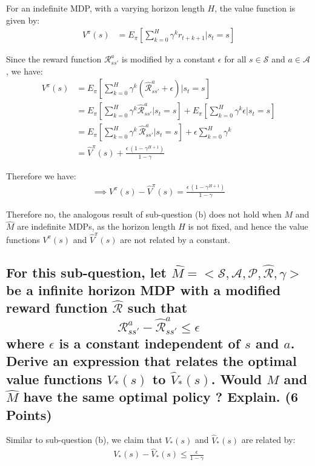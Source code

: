 \documentclass{article}
\renewcommand{\S}{\mathcal{S}}
\newcommand{\A}{\mathcal{A}}
\renewcommand{\P}{\mathcal{P}}
\newcommand{\R}{\mathcal{R}}
\newcommand{\Rhat}{\hat{\mathcal{R}}}
\begin{document}
For an indefinite MDP, with a varying horizon length $H$, the value function is given by:
\begin{align}
	V^\pi(s) &= E_\pi \left[ \sum_{k=0}^{H} \gamma^k r_{t+k+1} \bigg| s_t = s \right]
\end{align}

\noindent
Since the reward function $\R^a_{ss'}$ is modified by a constant $\epsilon$ for all $s \in \S$ and $a \in \A$, we have:
\begin{align}
	V^\pi(s) &= E_\pi \left[ \sum_{k=0}^{H} \gamma^k \left( \Rhat^a_{ss'} + \epsilon \right) \bigg| s_t = s \right] \\
	&= E_\pi \left[ \sum_{k=0}^{H} \gamma^k \Rhat^a_{ss'} \bigg| s_t = s \right] + E_\pi \left[ \sum_{k=0}^{H} \gamma^k \epsilon \bigg| s_t = s \right] \\
	&= E_\pi \left[ \sum_{k=0}^{H} \gamma^k \, \Rhat^a_{ss'} \bigg| s_t = s \right] + \epsilon \sum_{k=0}^{H} \gamma^k \\
	&= \hat{V}^\pi(s) + \frac{\epsilon \, (1 - \gamma^{H+1})}{1 - \gamma}
\end{align}

\noindent
Therefore we have:
\begin{align}
	\boxed{\implies V^\pi(s) - \hat{V}^\pi(s) = \frac{\epsilon \, (1 - \gamma^{H+1})}{1 - \gamma}}
\end{align}

\noindent
Therefore no, the analogous result of sub-question (b) does not hold when $M$ and $\hat{M}$ are indefinite MDPs, as the horizon length $H$ is not fixed, and hence the value functions $V^\pi(s)$ and $\hat{V}^\pi(s)$ are not related by a constant. 
\,

\subsection{For this sub-question, let $\hat{M} = < \S, \A, \P, \Rhat, \gamma >$ be a infinite horizon MDP with a modified reward function $\Rhat$ such that $$ \R^a_{ss'} - \Rhat^a_{ss'} \leq \epsilon $$ where $\epsilon$ is a constant independent of $s$ and $a$. Derive an expression that relates the optimal value functions $V_* (s)$ to $\hat{V}_* (s)$. Would $M$ and $\hat{M}$ have the same optimal policy ? Explain. (6 Points)}

Similar to sub-question (b), we claim that $V_*(s)$ and $\hat{V}_*(s)$ are related by:
\begin{align}
	V_*(s) - \hat{V}_*(s) \leq \frac{\epsilon}{1 - \gamma}
\end{align}
\end{document}
